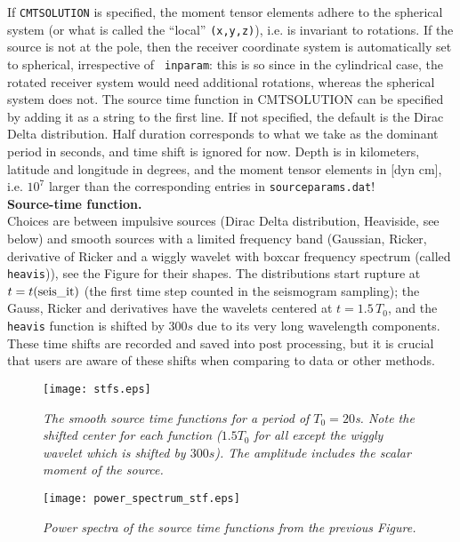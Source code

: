 \documentclass[11pt,letter,fleqn,english,notitlepage]{article}
\begin{document}
\noindent If {\tt CMTSOLUTION} is specified, the moment tensor elements adhere
to the spherical system (or what is called the ``local'' {\tt (x,y,z)}), i.e.
is invariant to rotations.  If the source is not at the pole, then the receiver
coordinate system is automatically set to spherical, irrespective of {\tt
inparam}: this is so since in the cylindrical case, the rotated receiver system
would need additional rotations, whereas the spherical system does not. The
source time function in CMTSOLUTION can be specified by adding it as a string
to the first line. If not specified, the default is the Dirac Delta
distribution. Half duration corresponds to what we take as the dominant period
in seconds, and time shift is ignored for now.  Depth is in kilometers,
latitude and longitude in degrees, and the moment tensor elements in [dyn cm],
i.e. $10^7$ larger than the corresponding entries in {\tt sourceparams.dat}! \\

\noindent \textbf{Source-time function.}\\
%
\noindent Choices are between impulsive sources (Dirac Delta distribution,
Heaviside, see below) and smooth sources with a limited frequency band
(Gaussian, Ricker, derivative of Ricker and a wiggly wavelet with boxcar
frequency spectrum (called {\tt heavis})), see the Figure for their shapes.
The distributions start rupture at $t=t({\rm seis\_it})$ (the first time step
counted in the seismogram sampling); the Gauss, Ricker and derivatives have the
wavelets centered at $t=1.5 \,T_0$, and the {\tt heavis} function is shifted by
$300 s$ due to its very long wavelength components. These time shifts are
recorded and saved into post processing, but it is crucial that users are aware
of these shifts when comparing to data or other methods. \\

\begin{figure*}[htb]
    \begin{center}
        \texttt{[image: stfs.eps]}
        \caption{\textit{The smooth source time functions for a period of
            $T_0=20$s. Note the shifted center for each function ($1.5 T_0$ for
            all except the wiggly wavelet which is shifted by $300s$). The
            amplitude includes the scalar moment of the source. }}
    \end{center}
\end{figure*}

\begin{figure*}[htb]
    \begin{center}
        \texttt{[image: power\_spectrum\_stf.eps]}
        \caption{\textit{Power spectra of the source time functions from the
            previous Figure.}}
    \end{center}
\end{figure*}
\end{document}

